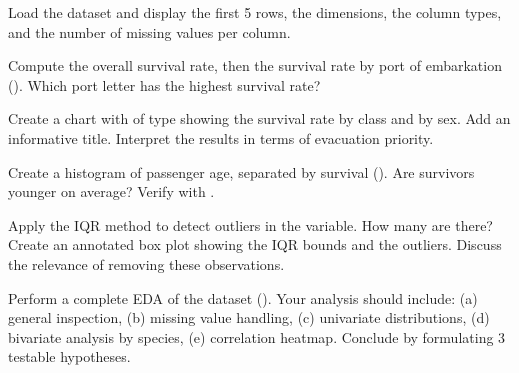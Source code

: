\begin{exercise}[$\star$]
Load the  dataset and display the first 5 rows, the dimensions, the column types, and the number of missing values per column.
\end{exercise}

\begin{exercise}[$\star$]
Compute the overall survival rate, then the survival rate by port of embarkation (). Which port letter has the highest survival rate?
\end{exercise}

\begin{exercise}[$\star\star$]
Create a chart with  of type  showing the survival rate by class and by sex. Add an informative title. Interpret the results in terms of evacuation priority.
\end{exercise}

\begin{exercise}[$\star\star$]
Create a histogram of passenger age, separated by survival (). Are survivors younger on average? Verify with .
\end{exercise}

\begin{exercise}[$\star\star\star$]
Apply the IQR method to detect outliers in the  variable. How many are there? Create an annotated box plot showing the IQR bounds and the outliers. Discuss the relevance of removing these observations.
\end{exercise}

\begin{exercise}[$\star\star\star$]
Perform a complete EDA of the  dataset (). Your analysis should include: (a) general inspection, (b) missing value handling, (c) univariate distributions, (d) bivariate analysis by species, (e) correlation heatmap. Conclude by formulating 3 testable hypotheses.
\end{exercise}

